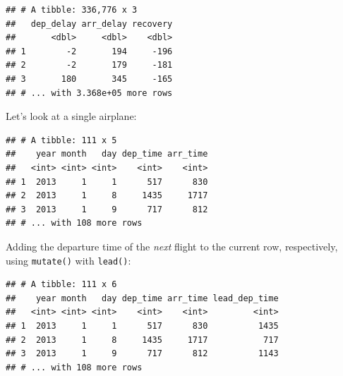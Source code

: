 \documentclass[]{book}
\newenvironment{Shaded}{}{}
\newcommand{\DataTypeTok}[1]{#1}
\newcommand{\KeywordTok}[1]{\textcolor[rgb]{0.00,0.00,1.00}{#1}}
\newcommand{\NormalTok}[1]{#1}
\newcommand{\OperatorTok}[1]{#1}
\newcommand{\StringTok}[1]{\textcolor[rgb]{0.00,0.50,0.50}{#1}}
\begin{document}
\begin{verbatim}
## # A tibble: 336,776 x 3
##   dep_delay arr_delay recovery
##       <dbl>     <dbl>    <dbl>
## 1        -2       194     -196
## 2        -2       179     -181
## 3       180       345     -165
## # ... with 3.368e+05 more rows
\end{verbatim}

Let's look at a single airplane:

\begin{Shaded}
\end{Shaded}

\begin{verbatim}
## # A tibble: 111 x 5
##    year month   day dep_time arr_time
##   <int> <int> <int>    <int>    <int>
## 1  2013     1     1      517      830
## 2  2013     1     8     1435     1717
## 3  2013     1     9      717      812
## # ... with 108 more rows
\end{verbatim}

Adding the departure time of the \emph{next} flight to the current row, respectively, using \texttt{mutate()} with \texttt{lead()}:

\begin{Shaded}
\end{Shaded}

\begin{verbatim}
## # A tibble: 111 x 6
##    year month   day dep_time arr_time lead_dep_time
##   <int> <int> <int>    <int>    <int>         <int>
## 1  2013     1     1      517      830          1435
## 2  2013     1     8     1435     1717           717
## 3  2013     1     9      717      812          1143
## # ... with 108 more rows
\end{verbatim}
\end{document}
